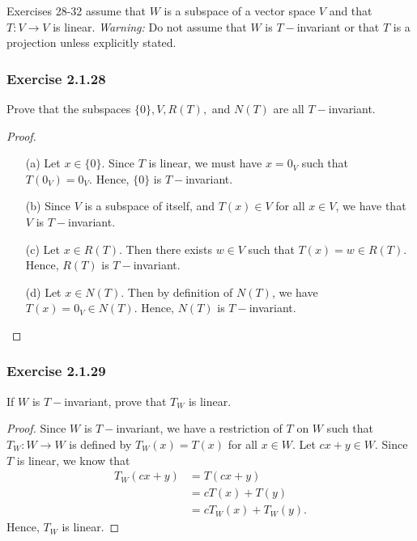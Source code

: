 Exercises 28-32 assume that \( W  \) is a subspace of a vector space \( V  \) and that \( T:V \to V  \) is linear. \textit{Warning:} Do not assume that \( W  \) is \( T- \)invariant or that \( T  \) is a projection unless explicitly stated. 

\subsubsection{Exercise 2.1.28} Prove that the subspaces \( \{ 0 \} , V , R(T),  \) and \( N(T) \) are all \( T- \)invariant.
\begin{proof}
\begin{enumerate}
    \item[(a)] Let \( x \in \{ 0 \}  \). Since \( T  \) is linear, we must have \( x = 0_{V}  \) such that \( T(0_{V}) = 0_{V} \). Hence, \( \{ 0 \}  \) is \( T- \)invariant.
    \item[(b)] Since \( V  \) is a subspace of itself, and \( T(x) \in V  \) for all \( x \in V  \), we have that \( V  \) is \( T- \)invariant. 
    \item[(c)] Let \( x \in R(T) \). Then there exists \( w \in V  \) such that \( T(x) = w \in R(T)  \). Hence, \( R(T) \) is \( T- \)invariant.
    \item[(d)] Let \( x \in N(T) \). Then by definition of \( N(T) \), we have \( T(x) = 0_{V} \in N(T) \). Hence, \( N(T) \) is \( T- \)invariant.
\end{enumerate}
\end{proof}


\subsubsection{Exercise 2.1.29} If \( W  \) is \( T- \)invariant, prove that \( T_{W}  \) is linear.
\begin{proof}
Since \( W  \) is \( T- \)invariant, we have a restriction of \( T  \) on \( W  \) such that \( T_{W} : W \to W   \) is defined by \( T_{W}(x) = T(x)  \) for all \( x \in W  \). Let \( cx + y \in W  \). Since \( T  \) is linear, we know that 
\begin{align*}
    T_{W}(cx+y) &= T(cx+y) \\
                &= cT(x) + T(y) \\
                &= c T_{W}(x) + T_{W}(y).
\end{align*}
Hence, \( T_{W}  \) is linear.
\end{proof}

